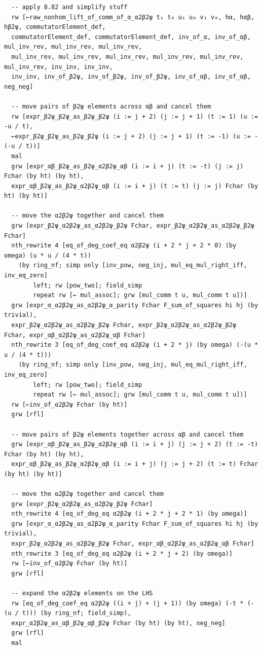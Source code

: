 \documentclass[10pt,a4paper]{article}
\begin{document}
\begin{Verbatim}
  -- apply 8.82 and simplify stuff
  rw [←raw_nonhom_lift_of_comm_of_α_α2β2ψ t₁ t₀ u₁ u₀ v₁ v₀, hα, hαβ, hβ2ψ, commutatorElement_def,
  commutatorElement_def, commutatorElement_def, inv_of_α, inv_of_αβ, mul_inv_rev, mul_inv_rev, mul_inv_rev,
  mul_inv_rev, mul_inv_rev, mul_inv_rev, mul_inv_rev, mul_inv_rev, mul_inv_rev, inv_inv, inv_inv,
  inv_inv, inv_of_β2ψ, inv_of_β2ψ, inv_of_β2ψ, inv_of_αβ, inv_of_αβ, neg_neg]

  -- move pairs of β2ψ elements across αβ and cancel them
  rw [expr_β2ψ_β2ψ_as_β2ψ_β2ψ (i := j + 2) (j := j + 1) (t := 1) (u := -u / t),
  ←expr_β2ψ_β2ψ_as_β2ψ_β2ψ (i := j + 2) (j := j + 1) (t := -1) (u := -(-u / t))]
  mal
  grw [expr_αβ_β2ψ_as_β2ψ_α2β2ψ_αβ (i := i + j) (t := -t) (j := j) Fchar (by ht) (by ht),
  expr_αβ_β2ψ_as_β2ψ_α2β2ψ_αβ (i := i + j) (t := t) (j := j) Fchar (by ht) (by ht)]

  -- move the α2β2ψ together and cancel them
  grw [expr_β2ψ_α2β2ψ_as_α2β2ψ_β2ψ Fchar, expr_β2ψ_α2β2ψ_as_α2β2ψ_β2ψ Fchar]
  nth_rewrite 4 [eq_of_deg_coef_eq α2β2ψ (i + 2 * j + 2 * 0) (by omega) (u * u / (4 * t))
    (by ring_nf; simp only [inv_pow, neg_inj, mul_eq_mul_right_iff, inv_eq_zero]
        left; rw [pow_two]; field_simp
        repeat rw [← mul_assoc]; grw [mul_comm t u, mul_comm t u])]
  grw [expr_α_α2β2ψ_as_α2β2ψ_α_parity Fchar F_sum_of_squares hi hj (by trivial),
  expr_β2ψ_α2β2ψ_as_α2β2ψ_β2ψ Fchar, expr_β2ψ_α2β2ψ_as_α2β2ψ_β2ψ Fchar, expr_αβ_α2β2ψ_as_α2β2ψ_αβ Fchar]
  nth_rewrite 3 [eq_of_deg_coef_eq α2β2ψ (i + 2 * j) (by omega) (-(u * u / (4 * t)))
    (by ring_nf; simp only [inv_pow, neg_inj, mul_eq_mul_right_iff, inv_eq_zero]
        left; rw [pow_two]; field_simp
        repeat rw [← mul_assoc]; grw [mul_comm t u, mul_comm t u])]
  rw [←inv_of_α2β2ψ Fchar (by ht)]
  grw [rfl]

  -- move pairs of β2ψ elements together across αβ and cancel them
  grw [expr_αβ_β2ψ_as_β2ψ_α2β2ψ_αβ (i := i + j) (j := j + 2) (t := -t) Fchar (by ht) (by ht),
  expr_αβ_β2ψ_as_β2ψ_α2β2ψ_αβ (i := i + j) (j := j + 2) (t := t) Fchar (by ht) (by ht)]

  -- move the α2β2ψ together and cancel them
  grw [expr_β2ψ_α2β2ψ_as_α2β2ψ_β2ψ Fchar]
  nth_rewrite 4 [eq_of_deg_eq α2β2ψ (i + 2 * j + 2 * 1) (by omega)]
  grw [expr_α_α2β2ψ_as_α2β2ψ_α_parity Fchar F_sum_of_squares hi hj (by trivial),
  expr_β2ψ_α2β2ψ_as_α2β2ψ_β2ψ Fchar, expr_αβ_α2β2ψ_as_α2β2ψ_αβ Fchar]
  nth_rewrite 3 [eq_of_deg_eq α2β2ψ (i + 2 * j + 2) (by omega)]
  rw [←inv_of_α2β2ψ Fchar (by ht)]
  grw [rfl]

  -- expand the α2β2ψ elements on the LHS
  rw [eq_of_deg_coef_eq α2β2ψ ((i + j) + (j + 1)) (by omega) (-t * (-(u / t))) (by ring_nf; field_simp),
  expr_α2β2ψ_as_αβ_β2ψ_αβ_β2ψ Fchar (by ht) (by ht), neg_neg]
  grw [rfl]
  mal


\end{Verbatim}
\end{document}
